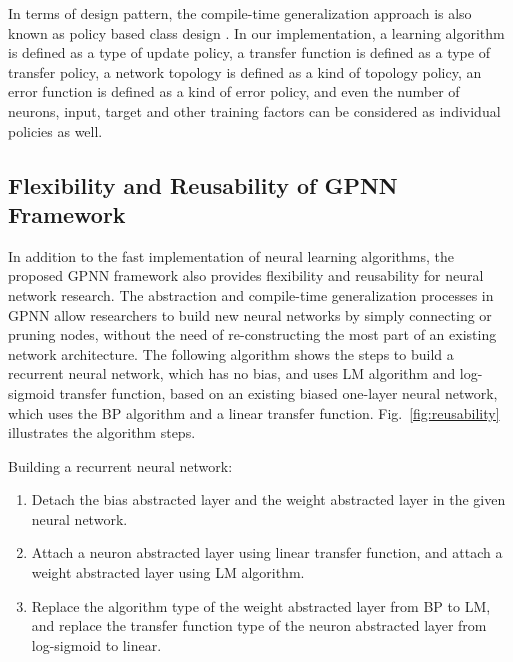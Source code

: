 \documentclass[procedia]{easychair}
\begin{document}
In terms of design pattern, the compile-time generalization approach is also known as policy based class design \cite{alexandrescu2001policy}.  In our implementation, a learning algorithm is defined as a type of update policy, a transfer function is defined as a type of transfer policy, a network topology is defined as a kind of topology policy, an error function is defined as a kind of error policy, and even the number of neurons, input, target and other training factors can be considered as individual policies as well.

\subsection{Flexibility and Reusability of GPNN Framework}

In addition to the fast implementation of neural learning algorithms, the proposed GPNN framework also provides flexibility and reusability for neural network research.  The abstraction and compile-time generalization processes in GPNN allow researchers to build new neural networks by simply connecting or pruning nodes, without the need of re-constructing the most part of an existing network architecture.  The following algorithm shows the steps to build a recurrent neural network, which has no bias, and uses LM algorithm and log-sigmoid transfer function, based on an existing biased one-layer neural network, which uses the BP algorithm and a linear transfer function.  Fig.~\ref{fig:reusability} illustrates the algorithm steps.

Building a recurrent neural network:

\begin{enumerate}
    \item Detach the bias abstracted layer and the weight abstracted layer in the given neural network.
    \item Attach a neuron abstracted layer using linear transfer function, and attach a weight abstracted layer using LM algorithm.
    \item Replace the algorithm type of the weight abstracted layer from BP to LM, and replace the transfer function type of the neuron abstracted layer from log-sigmoid to linear.
\end{enumerate}
\end{document}
